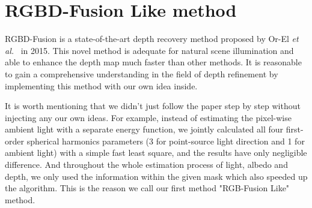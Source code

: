 \section{RGBD-Fusion Like method}
RGBD-Fusion is a state-of-the-art depth recovery method proposed by Or-El \emph{et al.}~\cite{or2015rgbd} in 2015.
This novel method is adequate for natural scene illumination and able to enhance the depth map much faster than other methods.
It is reasonable to gain a comprehensive understanding in the field of depth refinement by implementing this method with our own idea inside.

It is worth mentioning that we didn't just follow the paper step by step without injecting any our own ideas.
For example, instead of estimating the pixel-wise ambient light with a separate energy function, we jointly calculated all four first-order spherical harmonics parameters (3 for point-source light direction and 1 for ambient light) with a simple fast least square, and the results have only negligible difference.
And throughout the whole estimation process of light, albedo and depth, we only used the information within the given mask which also speeded up the algorithm.
This is the reason we call our first method "RGB-Fusion Like" method.

